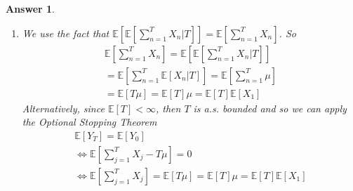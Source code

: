 \documentclass[12pt]{article}
\theoremstyle{colon}
\newtheorem*{answer}{Answer}
\begin{document}
\begin{answer}
\begin{enumerate}[label=\alph*)]
      We now show the last property of martingales.
      \begin{gather*}
        \mathbb{E}[Y{n+k} | \mathcal{F}_n ] = \mathbb{E}[\sum_{j = 1}^{n+k} X_j - (n+k) \mu | \mathcal{F}_n ] \\
        = \sum_{j = 1}^n X_j + \mathbb{E}[\sum_{j = n+1}^{n+k} X_j | \mathcal{F}_n ] - (n+k) \mu \\
        = \sum_{j = 1}^n X_j + \sum_{j = n+1}^{n+k} \mathbb{E}[X_j | \mathcal{F}_n ] - (n+k) \mu \\
        = \sum_{j = 1}^n X_j + k \mu - (n+k) \mu \\
        = \sum_{j = 1}^n X_j - n \mu = Y_n
      \end{gather*}
      Where $\mathbb{E}[X_j | \mathcal{F}_n ] = \mu$ since the $X_j$ are i.i.d. Thus, $Y_n$ is a martingale.
    \item We use the fact that $\mathbb{E}[ \mathbb{E}[ \sum_{n = 1}^T X_n | T ]] = \mathbb{E}[ \sum_{n = 1}^T X_n ]$. So
      \begin{gather*}
        \mathbb{E}[ \sum_{n = 1}^T X_n ] = \mathbb{E}[ \mathbb{E}[ \sum_{n = 1}^T X_n | T ]] \\
        = \mathbb{E}[ \sum_{n = 1}^T \mathbb{E}[ X_n | T ]] = \mathbb{E}[ \sum_{n = 1}^T \mu] \\
        = \mathbb{E}[ T \mu] = \mathbb{E}[T] \mu = \mathbb{E}[T] \mathbb{E}[X_1]
      \end{gather*}
      Alternatively, since $\mathbb{E}[T] < \infty$, then $T$ is a.s. bounded and so we can apply the Optional Stopping Theorem
      \begin{gather*}
        \mathbb{E}[Y_T] = \mathbb{E}[Y_0] \\
        \Longleftrightarrow \mathbb{E}[\sum_{j = 1}^T X_j - T \mu] = 0 \\
        \Longleftrightarrow \mathbb{E}[\sum_{j = 1}^T X_j] = \mathbb{E}[T \mu] = \mathbb{E}[T] \mu = \mathbb{E}[T] \mathbb{E}[X_1]
      \end{gather*}
  \end{enumerate}
\end{answer}
\end{document}
